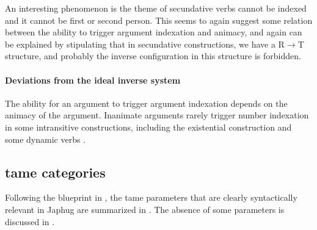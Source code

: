 \documentclass[a4paper, oneside, 12pt]{report}
\newcommand*{\textto}{$\to$}
\newcommand*{\citesec}[1]{\S~{#1}}
\begin{document}
An interesting phenomenon is the theme of secundative verbs
cannot be indexed and it cannot be first or second person.
This seems to again suggest some relation between
the ability to trigger argument indexation and animacy,
and again can be explained by stipulating that in secundative constructions,
we have a R\textto T structure,
and probably the inverse configuration in this structure is forbidden. 

\paragraph*{Deviations from the ideal inverse system}
The ability for an argument to trigger argument indexation
depends on the animacy of the argument.
Inanimate arguments rarely trigger number indexation in some intransitive constructions,
including the existential construction and some dynamic verbs
\citep[\citesec{14.6.1.1}]{jacques2021grammar}.


\subsection{\ac{tame} categories}

Following the blueprint in \citet{cinque1999adverbs},
the \ac{tame} parameters that are clearly syntactically relevant in Japhug
are summarized in .
The absence of some parameters is discussed in .
\end{document}
